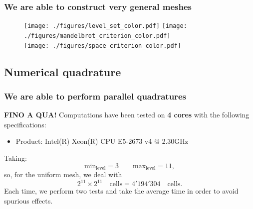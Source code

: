 \documentclass[8pt]{beamer}
\begin{document}
\begin{frame}
\frametitle{We are able to construct very general meshes}\pause
 \begin{figure}[!h]
\begin{center}
\texttt{[image: ./figures/level\_set\_color.pdf]}
\texttt{[image: ./figures/mandelbrot\_criterion\_color.pdf]} \\
\texttt{[image: ./figures/space\_criterion\_color.pdf]}
\end{center}
\end{figure}
\end{frame}

\subsection{Numerical quadrature}

\begin{frame}
\frametitle{We are able to perform parallel quadratures}
\textbf{FINO A QUA!}
Computations have been tested on \textbf{4 cores} with the following specifications:
\begin{itemize}
 \item Product: Intel(R) Xeon(R) CPU E5-2673 v4 @ 2.30GHz
\end{itemize}
Taking:
\begin{equation*}
 \text{min}_{\text{level}} = 3 \qquad \text{max}_{\text{level}} = 11,
\end{equation*}
so, for the uniform mesh, we deal with
\begin{equation*}
 2^{11} \times 2^{11} \quad \text{cells} = 4'194'304 \quad \text{cells}.
\end{equation*}
Each time, we perform two tests and take the average time in order to avoid spurious effects.
\end{frame}
\end{document}
